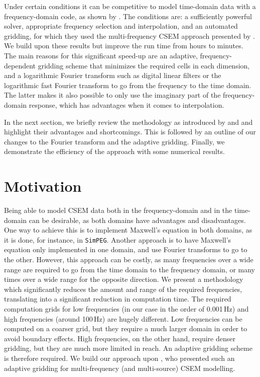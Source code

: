 \documentclass[
    manuscript,
  ]{geophysics}
\newcommand{\simpeg}{\texttt{SimPEG}\xspace}
\begin{document}
Under certain conditions it can be competitive to model time-domain data with a
frequency-domain code, as shown by \cite{GEO.08.Mulder}. The conditions are: a
sufficiently powerful solver, appropriate frequency selection and
interpolation, and an automated gridding, for which they used the
multi-frequency CSEM approach presented by \cite{GEO.07.Plessix}. We build upon
these results but improve the run time from hours to minutes. The main reasons
for this significant speed-up are an adaptive, frequency-dependent gridding
scheme that minimizes the required cells in each dimension, and a logarithmic
Fourier transform such as digital linear filters \citep[DLF, ][]{GP.71.Ghosh}
or the logarithmic fast Fourier transform \citep[FFTLog, ][]{RAS.00.Hamilton}
to go from the frequency to the time domain. The latter makes it also possible
to only use the imaginary part of the frequency-domain response, which has
advantages when it comes to interpolation.

In the next section, we briefly review the methodology as introduced by
\cite{GEO.07.Plessix} and \cite{GEO.08.Mulder} and highlight their advantages
and shortcomings. This is followed by an outline of our changes to the Fourier
transform and the adaptive gridding. Finally, we demonstrate the efficiency of
the approach with some numerical results.

\section{Motivation}

Being able to model CSEM data both in the frequency-domain and in the
time-domain can be desirable, as both domains have advantages and
disadvantages. One way to achieve this is to implement Maxwell's equation in
both domains, as it is done, for instance, in \simpeg \citep{CAG.15.Cockett}.
Another approach is to have Maxwell's equation only implemented in one domain,
and use Fourier transforms to go to the other. However, this approach can be
costly, as many frequencies over a wide range are required to go from the time
domain to the frequency domain, or many times over a wide range for the
opposite direction. We present a methodology which significantly reduces the
amount and range of the required frequencies, translating into a significant
reduction in computation time. The required computation grids for low
frequencies (in our case in the order of 0.001\,Hz) and high frequencies
(around 100\,Hz) are hugely different. Low frequencies can be computed on a
coarser grid, but they require a much larger domain in order to avoid boundary
effects. High frequencies, on the other hand, require denser gridding, but they
are much more limited in reach. An adaptive gridding scheme is therefore
required. We build our approach upon \cite{GEO.07.Plessix}, who presented such
an adaptive gridding for multi-frequency (and multi-source) CSEM modelling.
\end{document}
